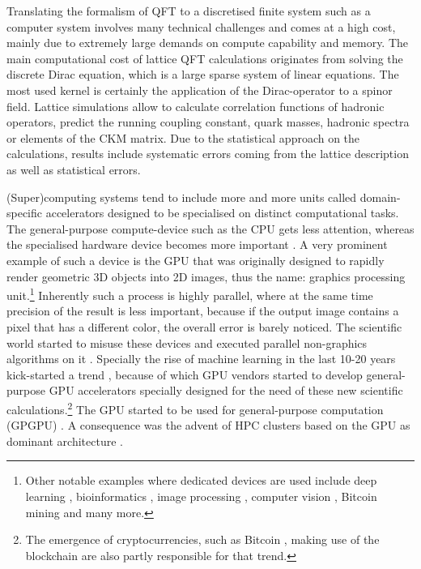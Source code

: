 \documentclass{article}
\theoremstyle{plain} %
\theoremstyle{convention} %
\theoremstyle{remark} %
\numberwithin{equation}{section}
\begin{document}
Translating the formalism of QFT to a discretised finite system such as a computer system involves many technical challenges and comes at a high cost, mainly due to extremely large demands on compute capability and memory. The main computational cost of lattice QFT calculations originates from solving the discrete Dirac equation, which is a large sparse system of linear equations. The most used kernel is certainly the application of the Dirac-operator to a spinor field. Lattice simulations allow to calculate correlation functions of hadronic operators, predict the running coupling constant, quark masses, hadronic spectra or elements of the CKM matrix. Due to the statistical approach on the calculations, results include systematic errors coming from the lattice description as well as statistical errors.

(Super)computing systems tend to include more and more units called domain-specific accelerators \cite{cong2010} designed to be specialised on distinct computational tasks. The general-purpose compute-device such as the CPU gets less attention, whereas the specialised hardware device becomes more important \cite{pan2018}. A very prominent example of such a device is the GPU that was originally designed to rapidly render geometric 3D objects into 2D images, thus the name: graphics processing unit.\footnote{Other notable examples where dedicated devices are used include deep learning \cite{han2016}, bioinformatics \cite{turakhia2018}, image processing \cite{qadeer2013}, computer vision \cite{sun2018}, Bitcoin mining \cite{satoh2007} and many more.} Inherently such a process is highly parallel, where at the same time precision of the result is less important, because if the output image contains a pixel that has a different color, the overall error is barely noticed. The scientific world started to misuse these devices and executed parallel non-graphics algorithms on it \cite{brodtkorb2013}. Specially the rise of machine learning in the last \num{10}-\num{20} years kick-started a trend \cite{steinkraus2005}, because of which GPU vendors started to develop general-purpose GPU accelerators specially designed for the need of these new scientific calculations.\footnote{The emergence of cryptocurrencies, such as Bitcoin \cite{nakamoto2019}, making use of the blockchain are also partly responsible for that trend.} The GPU started to be used for general-purpose computation (GPGPU) \cite{luebke2004}. A consequence was the advent of HPC clusters based on the GPU as dominant architecture \cite{kindratenko2011}.
\end{document}

